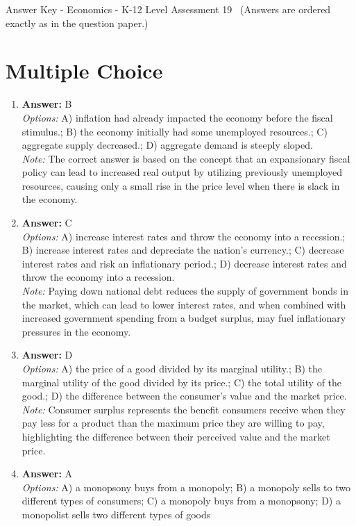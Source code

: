 \documentclass[12pt]{article}
\begin{document}
\begin{center}
Answer Key - Economics - K-12 Level Assessment 19 \
\small (Answers are ordered exactly as in the question paper.)
\end{center}

\section*{Multiple Choice}
\begin{enumerate}[label=\arabic*.]
\item \textbf{Answer:} B
\\ \textit{Options:} A) inflation had already impacted the economy before the fiscal stimulus.; B) the economy initially had some unemployed resources.; C) aggregate supply decreased.; D) aggregate demand is steeply sloped.
\\ \textit{Note:} The correct answer is based on the concept that an expansionary fiscal policy can lead to increased real output by utilizing previously unemployed resources, causing only a small rise in the price level when there is slack in the economy.
\item \textbf{Answer:} C
\\ \textit{Options:} A) increase interest rates and throw the economy into a recession.; B) increase interest rates and depreciate the nation's currency.; C) decrease interest rates and risk an inflationary period.; D) decrease interest rates and throw the economy into a recession.
\\ \textit{Note:} Paying down national debt reduces the supply of government bonds in the market, which can lead to lower interest rates, and when combined with increased government spending from a budget surplus, may fuel inflationary pressures in the economy.
\item \textbf{Answer:} D
\\ \textit{Options:} A) the price of a good divided by its marginal utility.; B) the marginal utility of the good divided by its price.; C) the total utility of the good.; D) the difference between the consumer's value and the market price.
\\ \textit{Note:} Consumer surplus represents the benefit consumers receive when they pay less for a product than the maximum price they are willing to pay, highlighting the difference between their perceived value and the market price.
\item \textbf{Answer:} A
\\ \textit{Options:} A) a monopsony buys from a monopoly; B) a monopoly sells to two different types of consumers; C) a monopoly buys from a monopsony; D) a monopolist sells two different types of goods

\end{enumerate}
\end{document}
